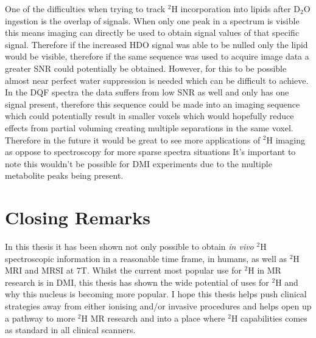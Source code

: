 One of the difficulties when trying to track $^2$H incorporation into lipids after D$_2$O ingestion is the overlap of signals. When only one peak in a spectrum is visible this means imaging can directly be used to obtain signal values of that specific signal. Therefore if the increased \ac{HDO} signal was able to be nulled only the lipid would be visible, therefore if the same sequence was used to acquire image data a greater \ac{SNR} could potentially be obtained. However, for this to be possible almost near perfect water suppression is needed which can be difficult to achieve. In the \ac{DQF} spectra the data suffers from low \ac{SNR} as well and only has one signal present, therefore this sequence could be made into an imaging sequence which could potentially result in smaller voxels which would hopefully reduce effects from partial voluming creating multiple separations in the same voxel. Therefore in the future it would be great to see more applications of $^2$H imaging as oppose to spectroscopy for more sparse spectra situations It's important to note this wouldn't be possible for \ac{DMI} experiments due to the multiple metabolite peaks being present.

\section{Closing Remarks}

In this thesis it has been shown not only possible to obtain \textit{in vivo} $^2$H spectroscopic information in a reasonable time frame, in humans, as well as $^2$H \ac{MRI} and \ac{MRSI} at 7T. Whilst the current most popular use for $^2$H in MR research is in \ac{DMI}, this thesis has shown the wide potential of uses for $^2$H and why this nucleus is becoming more popular. I hope this thesis helps push clinical strategies away from either ionising and/or invasive procedures and helps open up a pathway to more $^2$H MR research and into a place where $^2$H capabilities comes as standard in all clinical scanners.